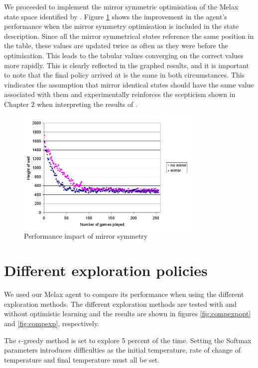 \documentclass{rucsthesis}
\begin{document}
We proceeded to implement the mirror symmetric optimisation of the Melax state space identified by \cite{yaeltetris}. Figure \ref{fig:comparemelax} shows the improvement in the agent's performance when the mirror symmetry optimisation is included in the state description. Since all the mirror symmetrical states reference the same position in the table, these values are updated twice as often as they were before the optimisation. This leads to the tabular values converging on the correct values more rapidly. This is clearly reflected in the graphed results, and it is important to note that the final policy arrived at is the same in both circumstances. This vindicates the assumption that mirror identical states should have the same value associated with them and experimentally reinforces the scepticism shown in Chapter 2 when interpreting the results of \cite{yaeltetris}. 

\begin{figure}[h]
\centering
\includegraphics[width=3.5in]{mirrormelax.png}
\caption{Performance impact of mirror symmetry}
\label{fig:comparemelax}
\end{figure}

\section{Different exploration policies}

We used our Melax agent to compare its performance when using the different exploration methods. The different exploration methods are tested with and without optimistic learning and the results are shown in figures \ref{fig:compexpopt} and \ref{fig:compexp}, respectively.

The $\epsilon$-greedy method is set to explore 5 percent of the time. Setting the Softmax parameters introduces difficulties as the initial temperature, rate of change of temperature and final temperature must all be set.
\end{document}
